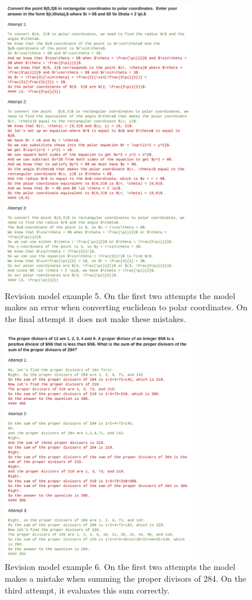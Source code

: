 \documentclass[11pt, letterpaper, logo]{googledeepmind}
\begin{document}
\begin{figure}
    \centering
    \includegraphics[width=0.75\textwidth]{revisions_ex5.png}
    \caption{Revision model example 5. On the first two attempts the model makes an error when converting euclidean to polar coordinates. On the final attempt it does not make these mistakes.}
    \label{fig:revisions_ex5}
\end{figure}

\begin{figure}
    \centering
    \includegraphics[width=0.75\textwidth]{revisions_ex6.png}
    \caption{Revision model example 6. On the first two attempts the model makes a mistake when summing the proper divisors of 284. On the third attempt, it evaluates this sum correctly.}
    \label{fig:revisions_ex6}
\end{figure}
\end{document}
